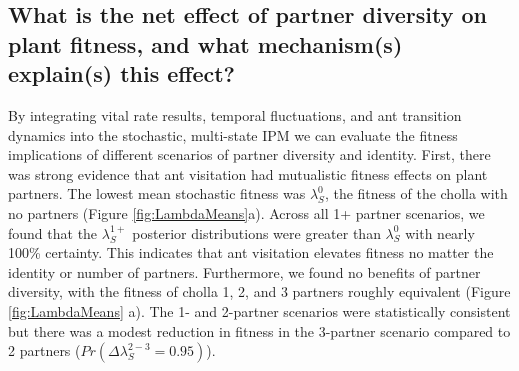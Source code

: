 \documentclass[11pt]{article}
\begin{document}
\subsection*{What is the net effect of partner diversity on plant fitness, and what mechanism(s) explain(s) this effect?}
By integrating vital rate results, temporal fluctuations, and ant transition dynamics into the stochastic, multi-state IPM we can evaluate the fitness implications of different scenarios of partner diversity and identity. 
First, there was strong evidence that ant visitation had mutualistic fitness effects on plant partners. 
The lowest mean stochastic fitness was $\lambda^{0}_{S}$, the fitness of the cholla with no partners (Figure \ref{fig:LambdaMeans}a).
Across all 1+ partner scenarios, we found that the $\lambda^{1+}_{S}$ posterior distributions were greater than $\lambda^{0}_{S}$ with nearly 100\% certainty.
This indicates that ant visitation elevates fitness no matter the identity or number of partners.
Furthermore, we found no benefits of partner diversity, with the fitness of cholla 1, 2, and 3 partners roughly equivalent (Figure \ref{fig:LambdaMeans} a).
The 1- and 2-partner scenarios were statistically consistent but there was a modest reduction in fitness in the 3-partner scenario compared to 2 partners ($Pr(\Delta\lambda^{2-3}_{S}=0.95)$).
\end{document}

